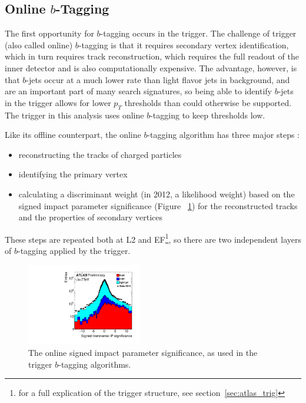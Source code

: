 \subsection{Online $b$-Tagging}
The first opportunity for $b$-tagging occurs in the trigger.  The challenge of trigger (also called online)
$b$-tagging is that it requires secondary vertex identification, which in turn requires track reconstruction,
which requires the full readout of the inner detector and is also computationally expensive.  The advantage,
however, is that $b$-jets occur at a much lower rate than light flavor jets in background, and are an important
part of many search signatures, so being able to identify $b$-jets in the trigger allows for lower $p_T$
thresholds than could otherwise be supported.  The trigger in this analysis uses online $b$-tagging to keep
thresholds low. 

Like its offline counterpart, the online $b$-tagging algorithm has three major steps \cite{online_btag_2}:
\begin{itemize}
    \item reconstructing the tracks of charged particles
    \item identifying the primary vertex
    \item calculating a discriminant weight (in 2012, a likelihood weight) based on the signed impact parameter significance 
    (Figure ~\ref{fig:ip_sig}) for the reconstructed tracks and the properties of secondary vertices
\end{itemize}

These steps are repeated both at L2 and EF\footnote{for a full explication of the trigger structure,
see section~\ref{sec:atlas_trig}}, so there are two independent layers of $b$-tagging applied by the
trigger.

\begin{figure}
    \center
   \includegraphics[width=0.45\textwidth]{ReconstructionPerformance/online_btag_IP.pdf}
   \caption{The online signed impact parameter significance, as used in the trigger $b$-tagging algorithms. \label{fig:ip_sig} }
\end{figure}


